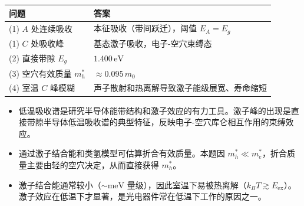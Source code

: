 \begin{formulabox}[答案汇总]
\begin{center}
\begin{tabular}{ll}
\toprule
\textbf{问题} & \textbf{答案} \\
\midrule
(1) $A$ 处连续吸收 & 本征吸收（带间跃迁），阈值 $E_A=E_g$ \\
(1) $C$ 处吸收峰 & 基态激子吸收，电子-空穴束缚态 \\
(2) 直接带隙 $E_g$ & $1.400\,\text{eV}$ \\
(3) 空穴有效质量 $m_h^*$ & $\approx0.095\,m_0$ \\
(4) 室温 $C$ 峰模糊 & 声子散射和热离解导致激子能级展宽、寿命缩短 \\
\bottomrule
\end{tabular}
\end{center}
\end{formulabox}

\begin{insightbox}[物理图像]
\begin{itemize}
    \item 低温吸收谱是研究半导体能带结构和激子效应的有力工具。激子峰的出现是直接带隙半导体低温吸收谱的典型特征，反映电子-空穴库仑相互作用的束缚效应。
    \item 通过激子结合能和类氢模型可估算折合有效质量。本题因 $m_h^*\ll m_e^*$，折合质量主要由轻的空穴决定，从而直接获得 $m_h^*$。
    \item 激子结合能通常较小（$\sim\text{meV}$ 量级），因此室温下易被热离解（$k_BT\gtrsim E_{\text{ex}}$）。激子效应在低温下才显著，是光电器件常在低温下工作的原因之一。
\end{itemize}
\end{insightbox}

